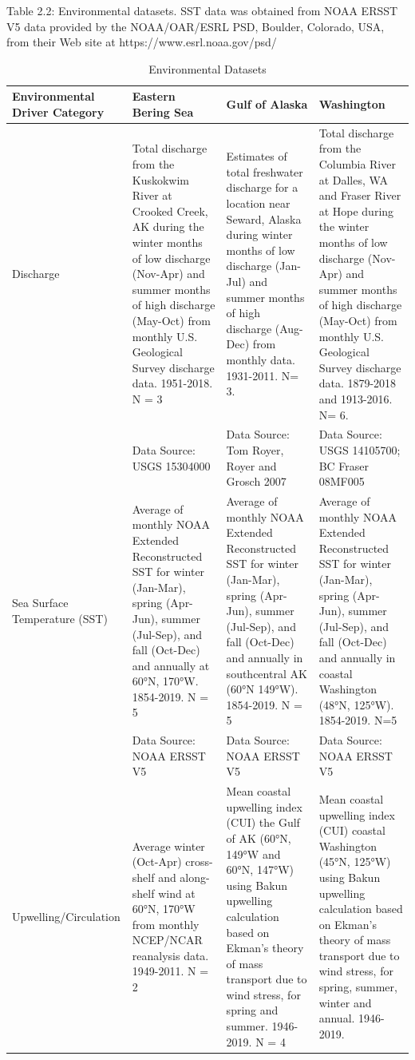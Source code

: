 \documentclass [11pt, proquest] {uwthesis}[2015/03/03]
\begin{document}
\clearpage
\begin{landscape}
Table 2.2: Environmental datasets. SST data was obtained from NOAA ERSST V5 data provided by the NOAA/OAR/ESRL PSD, Boulder, Colorado, USA, from their Web site at https://www.esrl.noaa.gov/psd/ 


\begingroup\fontsize{8}{10}\selectfont
\begin{longtable}[t]{l>{\raggedright\arraybackslash}p{20em}>{\raggedright\arraybackslash}p{20em}>{\raggedright\arraybackslash}p{20em}}
\caption{\label{tab:envvar}Environmental Datasets}\\
\toprule
Environmental Driver Category & Eastern Bering Sea & Gulf of Alaska & Washington\\
\midrule
Discharge & Total discharge from the Kuskokwim River at Crooked Creek, AK during the winter months of low discharge (Nov-Apr) and summer months of high discharge (May-Oct) from monthly U.S. Geological Survey discharge data. 1951-2018. N = 3 & Estimates of total freshwater discharge for a location near Seward, Alaska during winter months of low discharge (Jan-Jul) and summer months of high discharge (Aug-Dec) from monthly data. 1931-2011. N= 3. & Total discharge from the Columbia River at Dalles, WA and Fraser River at Hope during the winter months of low discharge (Nov-Apr) and summer months of high discharge (May-Oct) from monthly U.S. Geological Survey discharge data. 1879-2018 and 1913-2016. N= 6.\\
 & Data Source: USGS 15304000 & Data Source: Tom Royer, Royer and Grosch 2007 & Data Source: USGS 14105700; BC Fraser 08MF005\\
Sea Surface Temperature (SST) & Average of monthly NOAA Extended Reconstructed SST for winter (Jan-Mar), spring (Apr-Jun), summer (Jul-Sep), and fall (Oct-Dec) and annually at 60°N, 170°W. 1854-2019. N = 5 & Average of monthly NOAA Extended Reconstructed SST for winter (Jan-Mar), spring (Apr-Jun), summer (Jul-Sep), and fall (Oct-Dec) and annually in southcentral AK (60°N 149°W). 1854-2019. N = 5 & Average of monthly NOAA Extended Reconstructed SST for winter (Jan-Mar), spring (Apr-Jun), summer (Jul-Sep), and fall (Oct-Dec) and annually in coastal Washington (48°N, 125°W). 1854-2019. N=5\\
 & Data Source: NOAA ERSST V5 & Data Source: NOAA ERSST V5 & Data Source: NOAA ERSST V5\\
Upwelling/Circulation & Average winter (Oct-Apr) cross-shelf and along-shelf wind at 60°N, 170°W from monthly NCEP/NCAR reanalysis data. 1949-2011. N = 2 & Mean coastal upwelling index (CUI) the Gulf of AK (60°N, 149°W and 60°N, 147°W) using Bakun upwelling calculation based on Ekman's theory of mass transport due to wind stress, for spring and  summer. 1946-2019.  N = 4 & Mean coastal upwelling index (CUI) coastal Washington (45°N, 125°W) using Bakun upwelling calculation based on Ekman's theory of mass transport due to wind stress, for spring, summer, winter and annual. 1946-2019.\\

\end{longtable}
\end{landscape}
\end{document}
